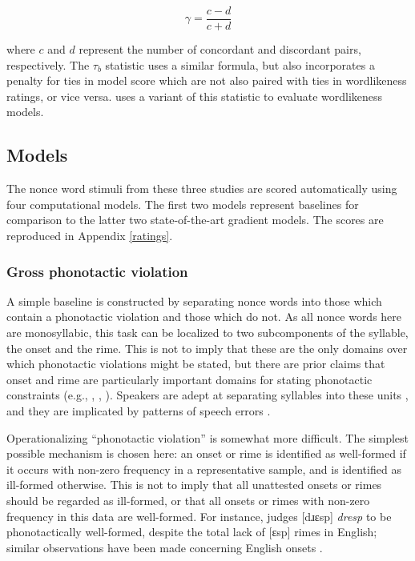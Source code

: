 \begin{equation*}
\gamma = \displaystyle\frac{c - d}{c + d}
\end{equation*}

\noindent
where $c$ and $d$ represent the number of concordant and discordant pairs, respectively.
The $\tau_b$ statistic uses a similar formula, but also incorporates a penalty for ties in model score which are not also paired with ties in wordlikeness ratings, or vice versa.
\citet{Albright2009a} uses a variant of this statistic to evaluate wordlikeness models.

\subsection{Models}

The nonce word stimuli from these three studies are scored automatically using four computational models.
The first two models represent baselines for comparison to the latter two state-of-the-art gradient models.
The scores are reproduced in Appendix \ref{ratings}.

\subsubsection{Gross phonotactic violation}

A simple baseline is constructed by separating nonce words into those which contain a phonotactic violation and those which do not. 
As all nonce words here are monosyllabic, this task can be localized to two subcomponents of the syllable, the onset and the rime. 
This is not to imply that these are the only domains over which phonotactic violations might be stated, but there are prior claims that onset and rime are particularly important domains for stating phonotactic constraints (e.g., \citealt{Fudge1969}, \citealt{Kessler1997}, \citealt{Treiman2000}). 
Speakers are adept at separating syllables into these units \citep{Treiman1983,Treiman1986,Treiman1995}, and they are implicated by patterns of speech errors \citep{Fowler1987,Fowler1993}.

Operationalizing ``phonotactic violation'' is somewhat more difficult.
The simplest possible mechanism is chosen here: an onset or rime is identified as well-formed if it occurs with non-zero frequency in a representative sample, and is identified as ill-formed otherwise.
This is not to imply that all unattested onsets or rimes should be regarded as ill-formed, or that all onsets or rimes with non-zero frequency in this data are well-formed.
For instance, \citet{Albright2009a} judges [dɹɛsp] \emph{dresp} to be phonotactically well-formed, despite the total lack of [ɛsp] rimes in English; similar observations have been made concerning English onsets \citep[e.g.,][]{Cairns1972,Moreton2002}.


